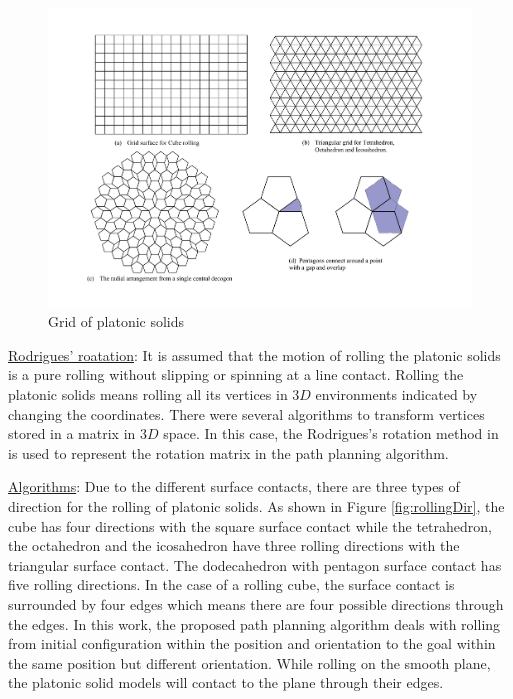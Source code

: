 %
\begin{figure}[h]
\centering
	\includegraphics[width=1\textwidth]{image/gridPlatonic.pdf}
	\caption{Grid of platonic solids}
	\label{fig:gridPlatonic}
\end{figure}


\noindent\uline{Rodrigues' roatation}: It is assumed that the motion of rolling the platonic solids is a pure rolling without slipping or spinning at a line contact.
Rolling the platonic solids means rolling all its vertices in $3D$ environments indicated by changing the coordinates. There were several algorithms to transform vertices stored in a matrix in $3D$ space. In this case, the Rodrigues's rotation method in \cite{Dai_Rodrigues_2015} is used to represent the rotation matrix in the path planning algorithm. 


%
\clearpage
\newpage
\noindent\uline{Algorithms}:
Due to the different surface contacts, there are three types of direction for the rolling of platonic solids. As shown in Figure \ref{fig:rollingDir}, the cube has four directions with the square surface contact while the tetrahedron, the octahedron and the icosahedron have three rolling directions with the triangular surface contact. The dodecahedron with pentagon surface contact has five rolling directions. 
In the case of a rolling cube, the surface contact is surrounded by four edges which means there are four possible directions through the edges. In this work, the proposed path planning algorithm deals with rolling from initial configuration within the position and orientation to the goal within the same position but different orientation. While rolling on the smooth plane, the platonic solid models will contact to the plane through their edges.\\

